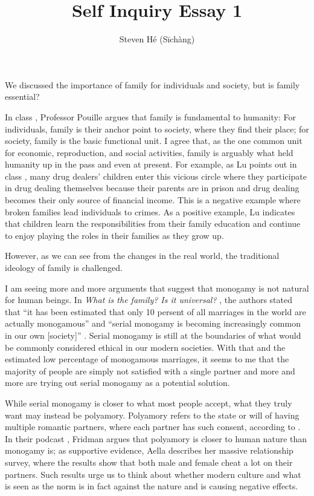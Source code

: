 \documentclass[12pt]{article}
\title{Self Inquiry Essay 1}
\author{Steven Hé (Sīchàng)}
\begin{document}
\maketitle
We discussed the importance of family for individuals and society,
but is family essential?

In class \citep{pouille2023ethics},
Professor Pouille argues that family is fundamental to humanity:
For individuals, family is their anchor point to society,
where they find their place;
for society, family is the basic functional unit.
I agree that, as the one common unit for economic, reproduction, and social
activities, family is arguably what held humanity up in the pass and even at
present.
For example, as Lu points out in class \citep{pouille2023ethics},
many drug dealers' children enter this vicious circle where
they participate in drug dealing themselves because their parents are in prison
and drug dealing becomes their only source of financial income.
This is a negative example where broken families lead individuals to crimes.
As a positive example, Lu \citep{lu1998family} indicates that
children learn the responsibilities from their family education and
continue to enjoy playing the roles in their families as they grow up.

However, as we can see from the changes in the real world,
the traditional ideology of family is challenged.

I am seeing more and more arguments that suggest that monogamy is not natural
for human beings.
In \textit{What is the family? Is it universal?} \citep{gittins1993family},
the authors stated that ``it has been estimated that only 10 persent of all
marriages in the world are actually monogamous'' and
``serial monogamy is becoming increasingly common in our own [society]''
\citep{gittins1993family}.
Serial monogamy is still at the boundaries of what would be commonly considered
ethical in our modern societies.
With that and the estimated low percentage of monogamous marriages,
it seems to me that the majority of people are simply not satisfied with a
single partner and
more and more are trying out serial monogamy as a potential solution.

While serial monogamy is closer to what most people accept,
what they truly want may instead be polyamory.
Polyamory refers to the state or will of having multiple romantic partners,
where each partner has such consent, according to \cite{wikipedia2023polyamory}.
In their podcast \citep{fridman2023aella},
Fridman argues that polyamory is closer to human nature than monogamy is;
as supportive evidence, Aella describes her massive relationship survey,
where the results show that both male and female cheat a lot on their partners.
Such results urge us to think about whether modern culture and what is seen as
the norm is in fact against the nature and is causing negative effects.

\citep{schwitzgebel2008thoughts}

\citep{malinowska2022love}
\pagebreak


\end{document}

